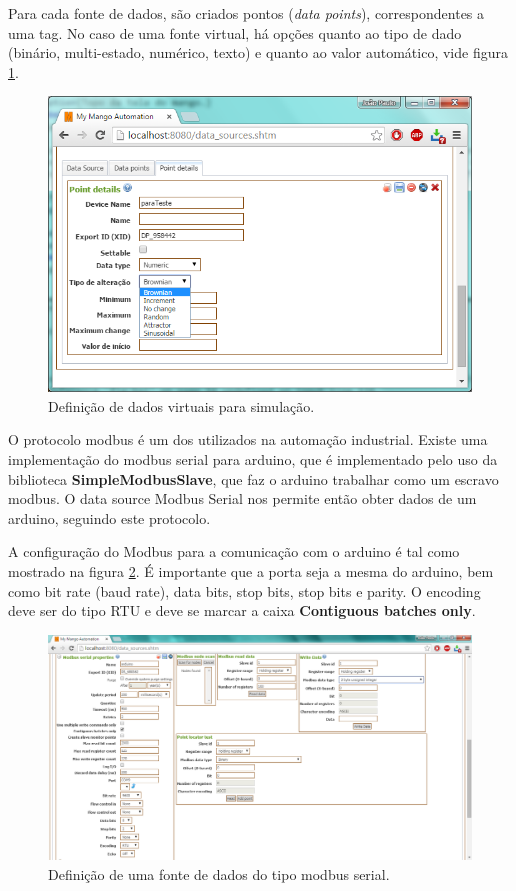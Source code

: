 Para cada fonte de dados, são criados pontos (\emph{data points}), correspondentes a uma tag. No caso de uma fonte virtual, há opções quanto ao tipo de dado (binário, multi-estado, numérico, texto) e quanto ao valor automático, vide figura \ref{fig:mango_virtual}.
\begin{figure}[hbt]
	\begin{center}
		\includegraphics[width=\textwidth]{figuras/mango_virtual}
	\end{center}
	\caption{Definição de dados virtuais para simulação.}
	\label{fig:mango_virtual}
\end{figure}

O protocolo modbus é um dos utilizados na automação industrial. Existe uma implementação do modbus serial para arduino, que é implementado pelo uso da biblioteca \textbf{SimpleModbusSlave}, que faz o arduino trabalhar como um escravo modbus. O data source Modbus Serial nos permite então obter dados de um arduino, seguindo este protocolo.

A configuração do Modbus para a comunicação com o arduino é tal como mostrado na figura \ref{fig:mango_modbus}. É importante que a porta seja a mesma do arduino, bem como bit rate (baud rate), data bits, stop bits, stop bits e parity. O encoding deve ser do tipo RTU e deve se marcar a caixa \textbf{Contiguous batches only}.

\begin{figure}[hbt]
	\begin{center}
		\includegraphics[width=\textwidth]{figuras/mango_modbus}
	\end{center}
	\caption{Definição de uma fonte de dados do tipo modbus serial.}
	\label{fig:mango_modbus}
\end{figure}

